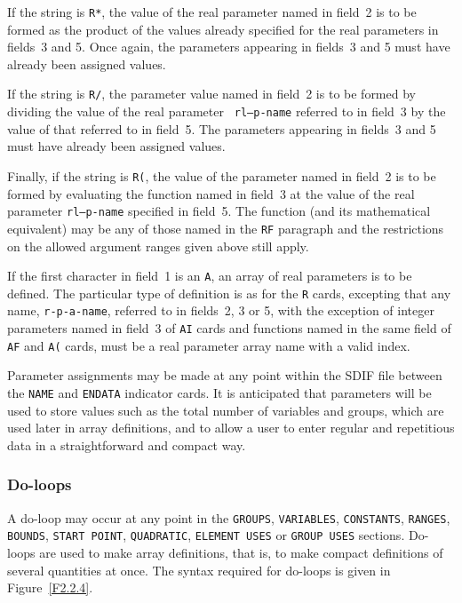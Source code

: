 \documentclass[a4paper]{article}
\begin{document}
If the string is  {\tt  R*},
the value  of the real parameter named in
field~2 is to be formed as the product of the values already specified
for the real parameters in fields~3  and 5. Once again, the parameters
appearing in fields~3 and 5 must have already been assigned values.

If the string is {\tt R/},
the parameter value named  in field~2 is to
be   formed  by dividing  the    value  of  the   real parameter  {\tt
rl--p-name} referred to in field~3  by the value of that  referred
to  in field~5. The parameters appearing  in fields~3 and 5 must  have
already been assigned values.

Finally, if the string is {\tt R(},
the value of the  parameter named
in field~2 is to be formed by evaluating the function named in field~3
at the value of  the real parameter  {\tt  rl--p-name} specified in
field~5. The function (and its mathematical equivalent)  may be any of
those named  in the {\tt  RF} paragraph and  the  restrictions on  the
allowed argument ranges given above still apply.

If the first  character  in field~1 is  an  {\tt A}, an array
of real
parameters is to be defined. The  particular type of definition is as
for the {\tt R} cards,
excepting that any name,  {\tt r-p-a-name},
referred  to  in  fields~2,  3  or  5, with  the  exception of integer
parameters named in field~3 of {\tt  AI} cards and functions  named in
the  same  field   of {\tt AF}  and  {\tt A(}  cards, must   be a real
parameter array name
with a valid index.

Parameter assignments may  be made at any  point  within the SDIF file
between the  {\tt NAME}
and {\tt  ENDATA}
indicator cards.   It is anticipated that  parameters
will be used to store values such as the total number of variables and
groups, which are used later in array
definitions, and to allow a user
to enter regular and repetitious data in a straightforward and compact
way.

\subsubsection{\label{S2.2.4}Do-loops}

A do-loop may occur at any point in the {\tt GROUPS}, {\tt VARIABLES},
{\tt CONSTANTS}, {\tt RANGES},  {\tt BOUNDS},
{\tt START POINT}, 
{\tt QUADRATIC}, {\tt ELEMENT USES} or
{\tt GROUP USES} sections.
Do-loops are  used to make   array
definitions,  that is,   to  make compact definitions of
several quantities at once. The syntax  required for do-loops is given
in Figure~\ref{F2.2.4}.
\end{document}
